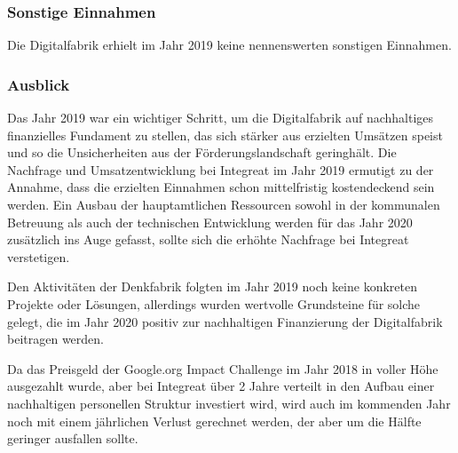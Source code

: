 \documentclass[12pt, a4paper]{article} %
\begin{document}
\hypertarget{sonstige-einnahmen}{%
\subsubsection{Sonstige Einnahmen}\label{sonstige-einnahmen}}

Die Digitalfabrik erhielt im Jahr 2019 keine nennenswerten sonstigen
Einnahmen.

\hypertarget{ausblick}{%
\subsubsection{Ausblick}\label{ausblick}}

Das Jahr 2019 war ein wichtiger Schritt, um die Digitalfabrik auf
nachhaltiges finanzielles Fundament zu stellen, das sich stärker aus
erzielten Umsätzen speist und so die Unsicherheiten aus der
Förderungslandschaft geringhält. Die Nachfrage und Umsatzentwicklung bei
Integreat im Jahr 2019 ermutigt zu der Annahme, dass die erzielten
Einnahmen schon mittelfristig kostendeckend sein werden. Ein Ausbau der
hauptamtlichen Ressourcen sowohl in der kommunalen Betreuung als auch
der technischen Entwicklung werden für das Jahr 2020 zusätzlich ins Auge
gefasst, sollte sich die erhöhte Nachfrage bei Integreat verstetigen.

Den Aktivitäten der Denkfabrik folgten im Jahr 2019 noch keine konkreten
Projekte oder Lösungen, allerdings wurden wertvolle Grundsteine für
solche gelegt, die im Jahr 2020 positiv zur nachhaltigen Finanzierung
der Digitalfabrik beitragen werden.

Da das Preisgeld der Google.org Impact Challenge im Jahr 2018 in voller
Höhe ausgezahlt wurde, aber bei Integreat über 2 Jahre verteilt in den
Aufbau einer nachhaltigen personellen Struktur investiert wird, wird
auch im kommenden Jahr noch mit einem jährlichen Verlust gerechnet
werden, der aber um die Hälfte geringer ausfallen sollte.
\end{document}
